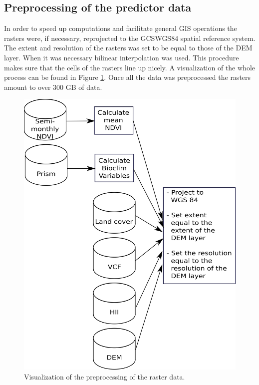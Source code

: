 \subsection{Preprocessing of the predictor data}

In order to speed up computations and facilitate general GIS operations the rasters were, if necessary, reprojected to the GCS\textunderscore WGS84 spatial reference system. The extent and resolution of the rasters was set to be equal to those of the DEM layer. When it was necessary bilinear interpolation was used. This procedure makes sure that the cells of the rasters line up nicely. A visualization of the whole process can be found in Figure \ref{fig:DataCommonlyUsedInSpeciesDistributionModels:DataScheme}. Once all the data was preprocessed the rasters amount to over $300$ GB of data.

\begin{figure}[!htb]
\centering
\includegraphics[scale=0.35]{VectorGraphics/DataScheme.png}
\caption{\label{fig:DataCommonlyUsedInSpeciesDistributionModels:DataScheme}Visualization of the preprocessing of the raster data.}
\end{figure}


